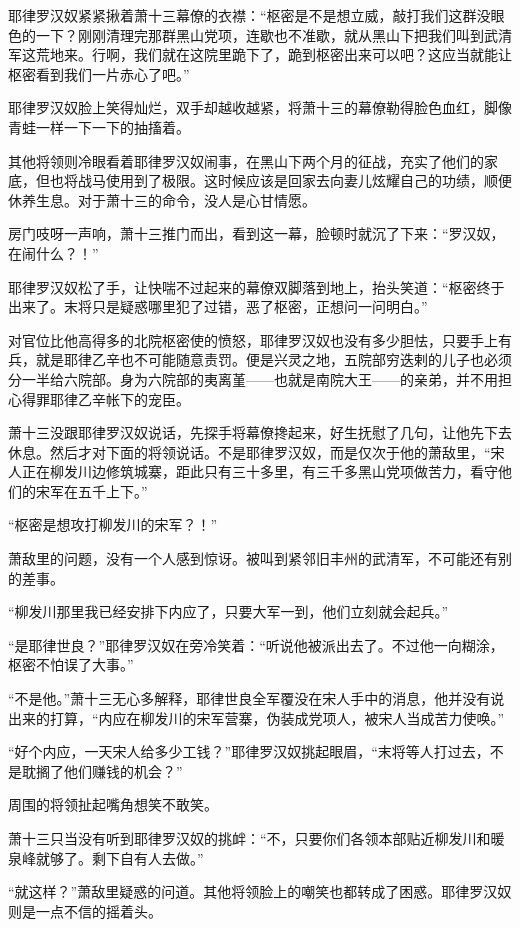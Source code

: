 耶律罗汉奴紧紧揪着萧十三幕僚的衣襟：“枢密是不是想立威，敲打我们这群没眼色的一下？刚刚清理完那群黑山党项，连歇也不准歇，就从黑山下把我们叫到武清军这荒地来。行啊，我们就在这院里跪下了，跪到枢密出来可以吧？这应当就能让枢密看到我们一片赤心了吧。”

耶律罗汉奴脸上笑得灿烂，双手却越收越紧，将萧十三的幕僚勒得脸色血红，脚像青蛙一样一下一下的抽搐着。

其他将领则冷眼看着耶律罗汉奴闹事，在黑山下两个月的征战，充实了他们的家底，但也将战马使用到了极限。这时候应该是回家去向妻儿炫耀自己的功绩，顺便休养生息。对于萧十三的命令，没人是心甘情愿。

房门吱呀一声响，萧十三推门而出，看到这一幕，脸顿时就沉了下来：“罗汉奴，在闹什么？！”

耶律罗汉奴松了手，让快喘不过起来的幕僚双脚落到地上，抬头笑道：“枢密终于出来了。末将只是疑惑哪里犯了过错，恶了枢密，正想问一问明白。”

对官位比他高得多的北院枢密使的愤怒，耶律罗汉奴也没有多少胆怯，只要手上有兵，就是耶律乙辛也不可能随意责罚。便是兴灵之地，五院部穷迭剌的儿子也必须分一半给六院部。身为六院部的夷离堇——也就是南院大王——的亲弟，并不用担心得罪耶律乙辛帐下的宠臣。

萧十三没跟耶律罗汉奴说话，先探手将幕僚搀起来，好生抚慰了几句，让他先下去休息。然后才对下面的将领说话。不是耶律罗汉奴，而是仅次于他的萧敌里，“宋人正在柳发川边修筑城寨，距此只有三十多里，有三千多黑山党项做苦力，看守他们的宋军在五千上下。”

“枢密是想攻打柳发川的宋军？！”

萧敌里的问题，没有一个人感到惊讶。被叫到紧邻旧丰州的武清军，不可能还有别的差事。

“柳发川那里我已经安排下内应了，只要大军一到，他们立刻就会起兵。”

“是耶律世良？”耶律罗汉奴在旁冷笑着：“听说他被派出去了。不过他一向糊涂，枢密不怕误了大事。”

“不是他。”萧十三无心多解释，耶律世良全军覆没在宋人手中的消息，他并没有说出来的打算，“内应在柳发川的宋军营寨，伪装成党项人，被宋人当成苦力使唤。”

“好个内应，一天宋人给多少工钱？”耶律罗汉奴挑起眼眉，“末将等人打过去，不是耽搁了他们赚钱的机会？”

周围的将领扯起嘴角想笑不敢笑。

萧十三只当没有听到耶律罗汉奴的挑衅：“不，只要你们各领本部贴近柳发川和暖泉峰就够了。剩下自有人去做。”

“就这样？”萧敌里疑惑的问道。其他将领脸上的嘲笑也都转成了困惑。耶律罗汉奴则是一点不信的摇着头。

